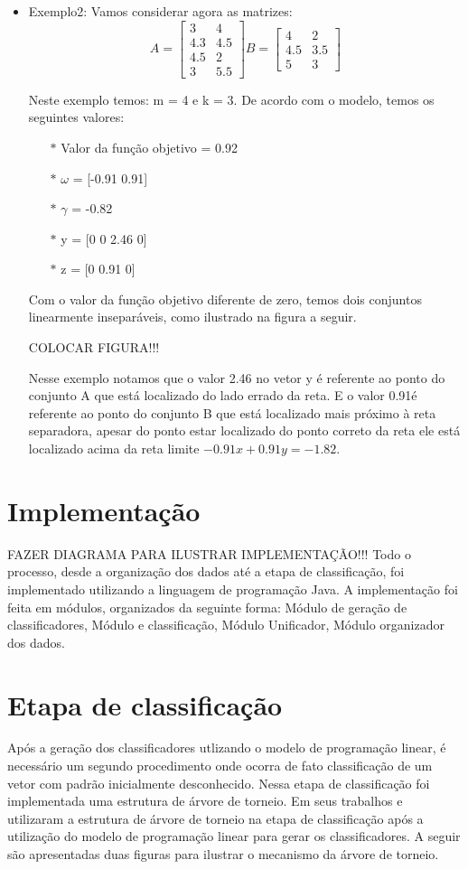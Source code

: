 \begin{itemize}
\item Exemplo2:
Vamos  considerar agora as matrizes:
$$A=\begin{bmatrix}3 & 4\\ 4.3 & 4.5\\ 4.5 & 2\\ 3 & 5.5\end{bmatrix}
B=\begin{bmatrix}4 & 2\\ 4.5 & 3.5\\ 5 & 3\end{bmatrix}$$

Neste exemplo temos: m = 4 e k = 3. De acordo com o modelo, temos os seguintes valores:
\begin{itemize}
\item[$\ast$] Valor da função objetivo = 0.92
\item[$\ast$] $\omega$ = [-0.91  0.91]
\item[$\ast$] $\gamma$ = -0.82
\item[$\ast$] y = [0 0 2.46 0]
\item[$\ast$] z = [0 0.91 0]
\end{itemize}

Com o valor da função objetivo diferente de zero, temos dois conjuntos linearmente inseparáveis, como ilustrado na figura a seguir.

COLOCAR FIGURA!!!

Nesse exemplo notamos que o valor 2.46 no vetor y é referente ao ponto do conjunto A que está localizado do lado errado da reta. E o valor 0.91é referente ao ponto do conjunto B que está localizado mais próximo à reta separadora, apesar do ponto estar localizado do ponto correto da reta ele está localizado acima da reta limite $-0.91x + 0.91y = -1.82$.
\end{itemize}

\section{Implementação}
FAZER DIAGRAMA PARA ILUSTRAR IMPLEMENTAÇÃO!!!
Todo o processo, desde a organização dos dados até a etapa de classificação, foi implementado utilizando a linguagem de programação Java. A implementação foi feita em módulos, organizados da seguinte forma: Módulo de geração de classificadores, Módulo e classificação, Módulo Unificador, Módulo organizador dos dados.

\section{Etapa de classificação}
Após a geração dos classificadores utlizando o modelo de programação linear, é necessário um segundo procedimento onde ocorra de fato classificação de um vetor com padrão inicialmente desconhecido. Nessa etapa de classificação foi implementada uma estrutura de árvore de torneio.
Em seus trabalhos  e  utilizaram a estrutura de árvore de torneio na etapa de classificação após a utilização do modelo de programação linear para gerar os classificadores.
A seguir são apresentadas duas figuras para ilustrar o mecanismo da árvore de torneio.

